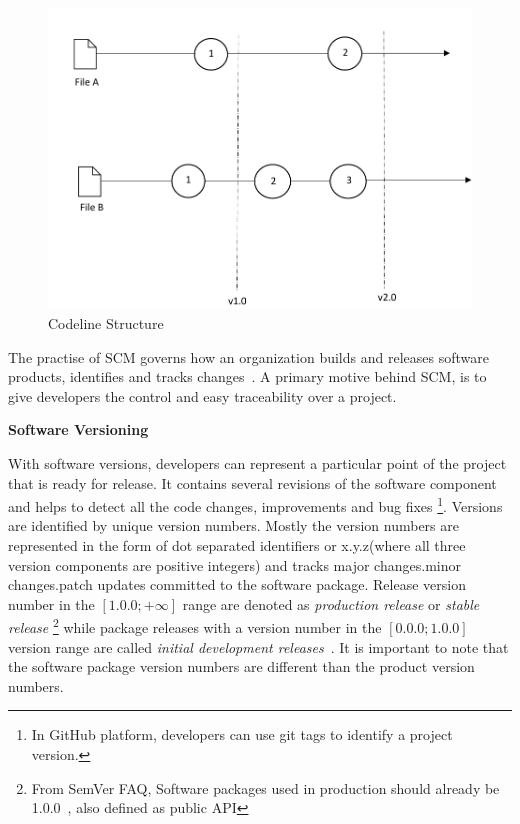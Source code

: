 \vspace{0.5cm}
\begin{figure}[H]
\centering
\includegraphics[scale=0.8]{figures/softwareversion.pdf}
\caption[Codeline Structure]{Codeline Structure}
\label{fig:CodelineStructure}
\end{figure}
\vspace{0.5cm}


The practise of \ac{SCM} governs how an organization builds and releases software products, identifies and tracks changes~\parencite{berczuk2003software}. A primary motive behind \ac{SCM}, is to give developers the control and easy traceability over a project. 






\vspace{0.2cm}
\noindent \textbf{Software Versioning}
\vspace{0.2cm}


\noindent With software versions, developers can represent a particular point of the project that is ready for release. It contains several revisions of the software component and helps to detect all the code changes, improvements and bug fixes \footnote{In GitHub platform, developers can use git tags to identify a project version.}. Versions are identified by unique version numbers. Mostly the version numbers are represented in the form of dot separated identifiers or x.y.z(where all three version components are positive integers) and tracks major changes.minor changes.patch updates committed to the software package. Release version number in the $[1.0.0; +\infty]$ range are denoted as \emph{production release} or \emph{stable release} \footnote{From \ac{SemVer} FAQ, Software packages used in production should already be 1.0.0~\parencite{preston2013semantic}, also defined as public API} while package releases with a version number in the $[0.0.0;1.0.0]$ version range are called \emph{initial development releases}~\parencite{8721084}. It is important to note that the software package version numbers are different than the product version numbers. 



